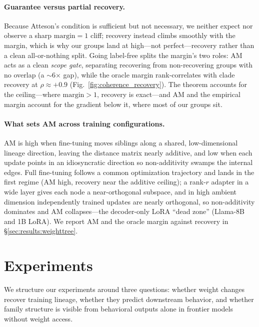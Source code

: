 \documentclass{article}
\theoremstyle{definition}
\theoremstyle{plain}
\begin{document}
\paragraph{Guarantee versus partial recovery.}
Because Atteson's condition is sufficient but not necessary, we neither expect nor observe a sharp
$\mathrm{margin}=1$ cliff; recovery instead climbs smoothly with the margin, which is why our groups land
at high---not perfect---recovery rather than a clean all-or-nothing split. Going label-free splits the
margin's two roles: AM acts as a clean \emph{scope gate}, separating recovering from non-recovering
groups with no overlap (a $\sim$6$\times$ gap), while the oracle margin rank-correlates with clade
recovery at $\rho\approx+0.9$ (Fig.~\ref{fig:coherence_recovery}). The theorem accounts for the
ceiling---where $\mathrm{margin}>1$, recovery is exact---and AM and the empirical margin account for the
gradient below it, where most of our groups sit.

\paragraph{What sets AM across training configurations.}
AM is high when fine-tuning moves siblings along a shared, low-dimensional lineage direction, leaving the
distance matrix nearly additive, and low when each update points in an idiosyncratic direction so
non-additivity swamps the internal edges. Full fine-tuning follows a common optimization trajectory and
lands in the first regime (AM high, recovery near the additive ceiling); a rank-$r$ adapter in a wide
layer gives each node a near-orthogonal subspace, and in high ambient dimension independently trained
updates are nearly orthogonal, so non-additivity dominates and AM collapses---the decoder-only LoRA
``dead zone'' (Llama-8B and 1B LoRA). We report AM and the oracle margin against recovery in
\S\ref{sec:results:weighttree}.


\section{Experiments}
\label{sec:experiments}
We structure our experiments around three questions: whether weight changes
recover training lineage, whether they predict downstream behavior, and
whether family structure is visible from behavioral outputs alone in
frontier models without weight access.
\end{document}
